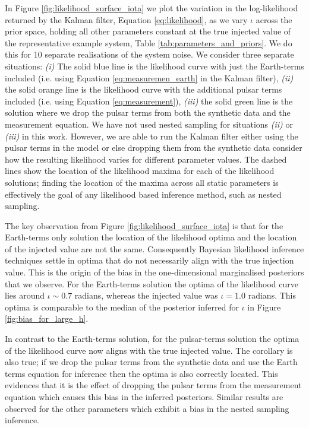 \documentclass[fleqn,usenatbib,useAMS]{mnras}
\begin{document}
In Figure \ref{fig:likelihood_surface_iota} we plot the variation in the log-likelihood returned by the Kalman filter, Equation \eqref{eq:likelihood}, as we vary $\iota$ across the prior space, holding all other parameters constant at the true injected value of the representative example system, Table \ref{tab:parameters_and_priors}. We do this for 10 separate realisations of the system noise. We consider three separate situations: \textit{(i)} The solid blue line is the likelihood curve with just the Earth-terms included (i.e. using Equation \ref{eq:measuremen_earth} in the Kalman filter), \textit{(ii)} the solid orange line is the likelihood curve with the additional pulsar terms included (i.e. using Equation \ref{eq:measurement}), \textit{(iii)} the solid green line is the solution where we drop the pulsar terms from both the synthetic data and the measurement equation. We have not used nested sampling for situations \textit{(ii)} or \textit{(iii)} in this work. However, we are able to run the Kalman filter either using the pulsar terms in the model or else dropping them from the synthetic data consider how the resulting likelihood varies for different parameter values. The dashed lines show the location of the likelihood maxima for each of the likelihood solutions; finding the location of the maxima across all static parameters is effectively the goal of any likelihood based inference method, such as nested sampling. \newline  

The key observation from Figure \ref{fig:likelihood_surface_iota} is that for the Earth-terms only solution the location of the likelihood optima and the location of the injected value are not the same. Consequently Bayesian likelihood inference techniques settle in optima that do not necessarily align with the true injection value. This is the origin of the bias in the one-dimensional marginalised posteriors that we observe.  For the Earth-terms solution the optima of the likelihood curve lies around $\iota \sim 0.7$ radians, whereas the injected value was $\iota = 1.0$ radians. This optima is comparable to the median of the posterior inferred for $\iota$ in Figure \ref{fig:bias_for_large_h}. \newline 

In contrast to the Earth-terms solution, for the pulsar-terms solution the optima of the likelihood curve now aligns with the true injected value. The corollary is also true; if we drop the pulsar terms from the synthetic data and use the Earth terms equation for inference then the optima is also correctly located. This evidences that it is the effect of dropping the pulsar terms from the measurement equation which causes this bias in the inferred posteriors. Similar results are observed for the other parameters which exhibit a bias in the nested sampling inference. \newline 
\end{document}
